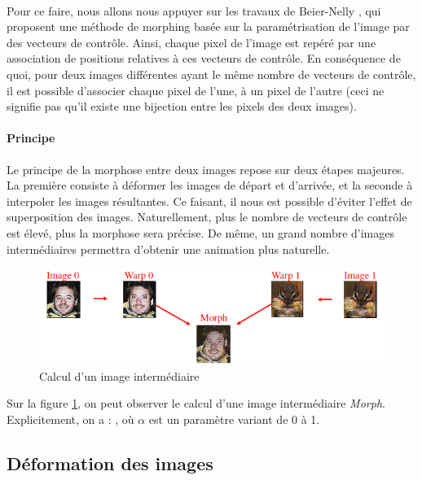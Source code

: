 \paragraph{} Pour ce faire, nous allons nous appuyer sur les travaux de Beier-Nelly \cite{beier1992feature}, qui proposent une méthode de morphing basée sur la paramétrisation de l'image
par des vecteurs de contrôle. Ainsi, chaque pixel de l'image est repéré par une association de positions relatives à ces vecteurs de contrôle. En conséquence de quoi, pour deux images
différentes ayant le même nombre de vecteurs de contrôle, il est possible d'associer chaque pixel de l'une, à un pixel de l'autre (ceci ne signifie pas qu'il existe une bijection entre les pixels des deux images). 

\paragraph{Principe} Le principe de la morphose entre deux images repose sur deux étapes majeures. 
La première consiste à déformer les images de départ et d'arrivée, et la seconde à interpoler les images résultantes.
Ce faisant, il nous est possible d'éviter l'effet de superposition des images. Naturellement, plus le nombre de vecteurs de 
contrôle est élevé, plus la morphose sera précise. De même, un grand nombre d'images intermédiaires permettra d'obtenir
 une animation plus naturelle.

\begin{figure}[h!]
    \centering
    \includegraphics[width=0.8\linewidth]{img/p3/principe.png}
    \caption{Calcul d'un image intermédiaire \cite{CSC320W}}
    \label{fig:morphInter}
\end{figure}

\begin{codeb}
Sur la figure \ref{fig:morphInter}, on peut observer le calcul d'une image intermédiaire \emph{Morph}. 
Explicitement, on a : , où $\alpha$ est un paramètre variant de 0 à 1.
\end{codeb}

\subsection{Déformation des images}
\label{subsec:deformation}
